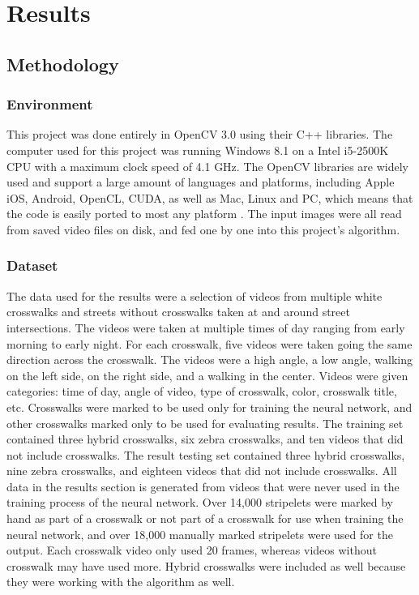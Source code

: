 \chapter{Results}
\label{results}

\section{Methodology}

\subsection{Environment}
This project was done entirely in OpenCV 3.0 using their C++ libraries. The computer used for this project was running Windows 8.1 on a Intel i5-2500K CPU with a maximum clock speed of 4.1 GHz. The OpenCV libraries are widely used and support a large amount of languages and platforms, including Apple iOS, Android, OpenCL, CUDA, as well as Mac, Linux and PC, which means that the code is easily ported to most any platform \cite{OpenCVPlatforms}. The input images were all read from saved video files on disk, and fed one by one into this project's algorithm. 

\subsection{Dataset}
The data used for the results were a selection of videos from multiple white crosswalks and streets without crosswalks taken at and around street intersections. The videos were taken at multiple times of day ranging from early morning to early night. For each crosswalk, five videos were taken going the same direction across the crosswalk. The videos were a high angle, a low angle, walking on the left side, on the right side, and a walking in the center.  Videos were given categories: time of day, angle of video, type of crosswalk, color, crosswalk title, etc. Crosswalks were marked to be used only for training the neural network, and other crosswalks marked only to be used for evaluating results. The training set contained three hybrid crosswalks, six zebra crosswalks, and ten videos that did not include crosswalks. The result testing set contained three hybrid crosswalks, nine zebra crosswalks, and eighteen videos that did not include crosswalks. All data in the results section is generated from videos that were never used in the training process of the neural network. Over 14,000 stripelets were marked by hand as part of a crosswalk or not part of a crosswalk for use when training the neural network, and over 18,000 manually marked stripelets were used for the output. Each crosswalk video only used 20 frames, whereas videos without crosswalk may have used more. Hybrid crosswalks were included as well because they were working with the algorithm as well. 


